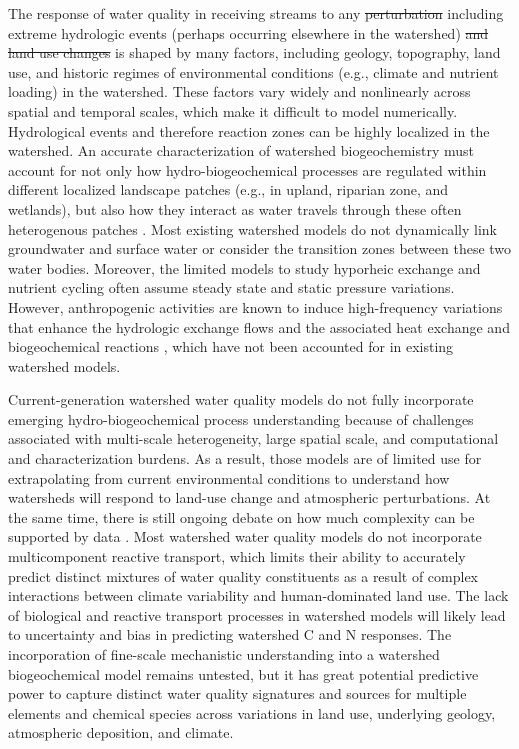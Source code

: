 \documentclass[preprint,review, 12pt]{elsarticle}
\providecommand{\DIFadd}[1]{{\protect\color{blue}\uwave{#1}}} %
\providecommand{\DIFdel}[1]{{\protect\color{red}\sout{#1}}}                      %
\providecommand{\DIFaddbegin}{} %
\providecommand{\DIFaddend}{} %
\providecommand{\DIFdelbegin}{} %
\providecommand{\DIFdelend}{} %
\newcommand{\DIFscaledelfig}{0.5}
\newlength{\DIFdelgraphicswidth} %
\newlength{\DIFdelgraphicsheight} %
\newcommand{\DIFaddincludegraphics}[2][]{{\color{blue}\fbox{\DIFOincludegraphics[#1]{#2}}}} %
\newcommand{\DIFdelincludegraphics}[2][]{%
\sbox{\DIFdelgraphicsbox}{\DIFOincludegraphics[#1]{#2}}%
\settoboxwidth{\DIFdelgraphicswidth}{\DIFdelgraphicsbox} %
\settoboxtotalheight{\DIFdelgraphicsheight}{\DIFdelgraphicsbox} %
\scalebox{\DIFscaledelfig}{%
\parbox[b]{\DIFdelgraphicswidth}{\usebox{\DIFdelgraphicsbox}\\[-\baselineskip] \rule{\DIFdelgraphicswidth}{0em}}\llap{\resizebox{\DIFdelgraphicswidth}{\DIFdelgraphicsheight}{%
\setlength{\unitlength}{\DIFdelgraphicswidth}%
\begin{picture}(1,1)%
\thicklines\linethickness{2pt} %
{\color[rgb]{1,0,0}\put(0,0){\framebox(1,1){}}}%
{\color[rgb]{1,0,0}\put(0,0){\line( 1,1){1}}}%
{\color[rgb]{1,0,0}\put(0,1){\line(1,-1){1}}}%
\end{picture}%
}\hspace*{3pt}}} %
} %
\DeclareRobustCommand{\DIFaddbegin}{\DIFOaddbegin \let\includegraphics\DIFaddincludegraphics} %
\DeclareRobustCommand{\DIFaddend}{\DIFOaddend \let\includegraphics\DIFOincludegraphics} %
\DeclareRobustCommand{\DIFdelbegin}{\DIFOdelbegin \let\includegraphics\DIFdelincludegraphics} %
\DeclareRobustCommand{\DIFdelend}{\DIFOaddend \let\includegraphics\DIFOincludegraphics} %
\begin{document}
 The response of water quality in receiving streams to any \DIFdelbegin \DIFdel{perturbation }\DIFdelend \DIFaddbegin \DIFadd{perturbations }\DIFaddend including extreme hydrologic events (perhaps occurring elsewhere in the watershed) \DIFdelbegin \DIFdel{and land use changes }\DIFdelend is shaped by many factors, including geology, topography, land use, and historic regimes of environmental conditions (e.g., climate and nutrient loading) in the watershed. These factors vary widely and nonlinearly across spatial and temporal scales, which make it difficult to model numerically. Hydrological events \citep{Lu2017a} and therefore reaction zones \citep{McClain2003} can be highly localized in the watershed. An accurate characterization of watershed biogeochemistry must account for not only how hydro-biogeochemical processes are regulated within different localized landscape patches (e.g., in upland, riparian zone, and wetlands), but also how they interact as water travels through these often heterogenous patches \citep{Laudon2018b}. Most existing watershed models do not dynamically link groundwater and surface water or consider the transition zones between these two water bodies. Moreover, the limited models to study hyporheic exchange and nutrient cycling often assume steady state and static pressure variations. However, anthropogenic activities are known to induce high-frequency variations that enhance the hydrologic exchange flows and the associated heat exchange and biogeochemical reactions \citep{Shuai2019b,Song2018b}, which have not been accounted for in existing watershed models.

Current-generation watershed water quality models do not fully incorporate emerging hydro-biogeochemical process understanding because of challenges associated with multi-scale heterogeneity, large spatial scale, and computational and characterization burdens. As a result, those models are of limited use for extrapolating from current environmental conditions to understand how watersheds will respond to land-use change and atmospheric perturbations. At the same time, there is still ongoing debate on how much complexity can be supported by data \citep{Jackson-Blakea}. Most watershed water quality models \citep{Kaushal2018f, Vidon2018} do not incorporate multicomponent reactive transport, which limits their ability to accurately predict distinct mixtures of water quality constituents \citep{Kaushal2018f} as a result of complex interactions between climate variability and human-dominated land use. The lack of biological and reactive transport processes in watershed models will likely lead to uncertainty and bias in predicting watershed C and N responses. The incorporation of fine-scale mechanistic understanding into a watershed biogeochemical model remains untested, but it has great potential predictive power to capture distinct water quality signatures and sources for multiple elements and chemical species across variations in land use, underlying geology, atmospheric deposition, and climate. 
\end{document}
